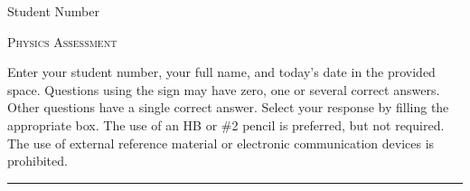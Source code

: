 \documentclass[
    11pt,
    fleqn,
]{scrartcl}
\newlength{\mylen}
\begin{document}
%
%
%
%
%
%



%

%
%

\begin{examcopy}[2]

\setlength{\mylen}{\linewidth}
\addtolength{\mylen}{-17em}
\begin{minipage}{\linewidth}
    \centering
    \begin{minipage}{15.5em}
        \centering
        Student Number \\
    \end{minipage}
    \begin{minipage}{\mylen}
        \centering
        \textsc{Physics Assessment} \\
    \end{minipage}
\end{minipage}

\null\hfill\parbox[c]{0.9\linewidth}{\small
    Enter your student number, your full name, and today's date in the provided space.
    Questions using the sign \multiSymbole{} may have zero, one or several correct answers.
    Other questions have a single correct answer.
    Select your response by filling the appropriate box.
    The use of an HB or \#2 pencil is preferred, but not required.
    The use of external reference material or electronic communication devices is prohibited.
}\hfill\null

\rule[0pt]{\linewidth}{0.5pt}


\end{examcopy}
\end{document}
